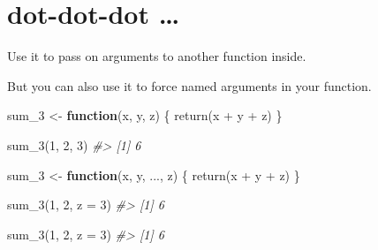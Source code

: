 \documentclass[
]{book}
\newenvironment{Shaded}{\begin{snugshade}}{\end{snugshade}}
\newcommand{\AttributeTok}[1]{\textcolor[rgb]{0.77,0.63,0.00}{#1}}
\newcommand{\CommentTok}[1]{\textcolor[rgb]{0.56,0.35,0.01}{\textit{#1}}}
\newcommand{\ControlFlowTok}[1]{\textcolor[rgb]{0.13,0.29,0.53}{\textbf{#1}}}
\newcommand{\DecValTok}[1]{\textcolor[rgb]{0.00,0.00,0.81}{#1}}
\newcommand{\FunctionTok}[1]{\textcolor[rgb]{0.00,0.00,0.00}{#1}}
\newcommand{\NormalTok}[1]{#1}
\newcommand{\OtherTok}[1]{\textcolor[rgb]{0.56,0.35,0.01}{#1}}
\newcommand{\SpecialCharTok}[1]{\textcolor[rgb]{0.00,0.00,0.00}{#1}}
\begin{document}
\hypertarget{dot-dot-dot}{%
\section{dot-dot-dot \ldots{}}\label{dot-dot-dot}}

Use it to pass on arguments to another function inside.

But you can also use it to force named arguments in your function.

\begin{Shaded}
\begin{Highlighting}[]
\NormalTok{sum\_3 }\OtherTok{\textless{}{-}} \ControlFlowTok{function}\NormalTok{(x, y, z) \{}
  \FunctionTok{return}\NormalTok{(x }\SpecialCharTok{+}\NormalTok{ y }\SpecialCharTok{+}\NormalTok{ z)}
\NormalTok{\}}
\end{Highlighting}
\end{Shaded}

\begin{Shaded}
\begin{Highlighting}[]
\FunctionTok{sum\_3}\NormalTok{(}\DecValTok{1}\NormalTok{, }\DecValTok{2}\NormalTok{, }\DecValTok{3}\NormalTok{)}
\CommentTok{\#\textgreater{} [1] 6}
\end{Highlighting}
\end{Shaded}

\begin{Shaded}
\begin{Highlighting}[]
\NormalTok{sum\_3 }\OtherTok{\textless{}{-}} \ControlFlowTok{function}\NormalTok{(x, y, ..., z) \{}
  \FunctionTok{return}\NormalTok{(x }\SpecialCharTok{+}\NormalTok{ y }\SpecialCharTok{+}\NormalTok{ z)}
\NormalTok{\}}
\end{Highlighting}
\end{Shaded}

\begin{Shaded}
\begin{Highlighting}[]
\FunctionTok{sum\_3}\NormalTok{(}\DecValTok{1}\NormalTok{, }\DecValTok{2}\NormalTok{, }\AttributeTok{z =} \DecValTok{3}\NormalTok{)}
\CommentTok{\#\textgreater{} [1] 6}
\end{Highlighting}
\end{Shaded}

\begin{Shaded}
\begin{Highlighting}[]
\FunctionTok{sum\_3}\NormalTok{(}\DecValTok{1}\NormalTok{, }\DecValTok{2}\NormalTok{, }\AttributeTok{z =} \DecValTok{3}\NormalTok{)}
\CommentTok{\#\textgreater{} [1] 6}
\end{Highlighting}
\end{Shaded}
\end{document}
